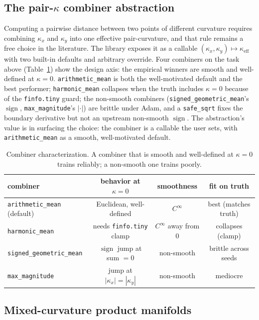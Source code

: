 \documentclass{article}
\newcommand{\kp}{\kappa}
\newcommand{\code}[1]{\texttt{#1}}
\begin{document}
\subsection{The pair-$\kp$ combiner abstraction}
\label{sec:c6}

Computing a pairwise distance between two points of different curvature
requires combining $\kp_x$ and $\kp_y$ into one effective pair-curvature,
and that rule remains a free choice in the literature. The library
exposes it as a callable $(\kp_x, \kp_y) \mapsto \kp_{\text{eff}}$ with
two built-in defaults and arbitrary override. Four combiners on the task above
(Table~\ref{tab:combiner}) show the design axis: the empirical winners
are smooth and well-defined at $\kp = 0$. \code{arithmetic\_mean} is both
the well-motivated default and the best performer; \code{harmonic\_mean}
collapses when the truth includes $\kp = 0$ because of the
\code{finfo.tiny} guard; the non-smooth combiners
(\code{signed\_geometric\_mean}'s $\operatorname{sign}$,
\code{max\_magnitude}'s $|\cdot|$) are brittle under Adam, and a
\code{safe\_sqrt} fixes the boundary derivative but not an upstream
non-smooth $\operatorname{sign}$. The abstraction's value is in surfacing
the choice: the combiner is a callable the user sets, with
\code{arithmetic\_mean} as a smooth, well-motivated default.

\begin{table}[t]
  \centering
  \caption{Combiner characterization. A combiner that is smooth and
  well-defined at $\kp=0$ trains reliably; a non-smooth one trains poorly.}
  \label{tab:combiner}
  \begin{tabular}{lccc}
    \toprule
    combiner & behavior at $\kp = 0$ & smoothness & fit on truth \\
    \midrule
    \code{arithmetic\_mean} (default) & Euclidean, well-defined & $C^\infty$ & best (matches truth) \\
    \code{harmonic\_mean} & needs \code{finfo.tiny} clamp & $C^\infty$ away from $0$ & collapses (clamp) \\
    \code{signed\_geometric\_mean} & $\operatorname{sign}$ jump at sum $=0$ & non-smooth & brittle across seeds \\
    \code{max\_magnitude} & jump at $|\kp_x|=|\kp_y|$ & non-smooth & mediocre \\
    \bottomrule
  \end{tabular}
\end{table}

\subsection{Mixed-curvature product manifolds}
\label{sec:c53}
\end{document}
